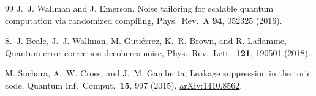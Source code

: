 \begin{thebibliography}{99}
J.~J. Wallman and J. Emerson, Noise tailoring for scalable quantum computation via randomized compiling, Phys.\ Rev.\ A \textbf{94}, 052325 (2016).

S.~J. Beale, J.~J. Wallman, M. Guti\'errez, K.~R. Brown, and R. Laflamme, Quantum error correction decoheres noise, Phys.\ Rev.\ Lett.\ \textbf{121}, 190501 (2018).

M. Suchara, A.~W. Cross, and J.~M. Gambetta, Leakage suppression in the toric code, Quantum Inf.\ Comput.\ \textbf{15}, 997 (2015), \href{https://arxiv.org/abs/1410.8562}{arXiv:1410.8562}.
\end{thebibliography}
